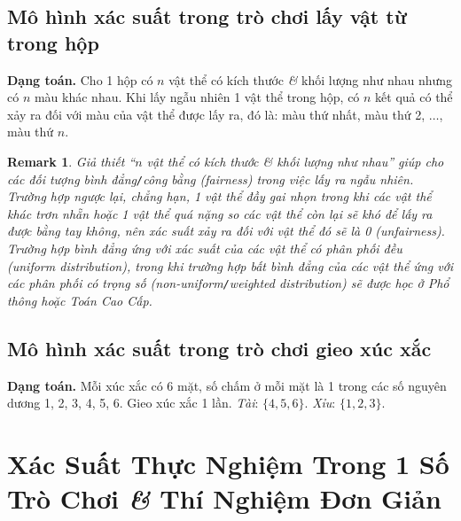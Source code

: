 \documentclass[oneside]{book}
\numberwithin{equation}{section}
\newtheorem{remark}{Remark}[section]
\begin{document}
\subsection{Mô hình xác suất trong trò chơi lấy vật từ trong hộp}
\textbf{Dạng toán.} Cho 1 hộp có $n$ vật thể có kích thước \textit{\&} khối lượng như nhau nhưng có $n$ màu khác nhau. Khi lấy ngẫu nhiên 1 vật thể trong hộp, có $n$ kết quả có thể xảy ra đối với màu của vật thể được lấy ra, đó là: màu thứ nhất, màu thứ 2, $\ldots$, màu thứ $n$.

\begin{remark}
	Giả thiết ``$n$ vật thể có kích thước \textit{\&} khối lượng như nhau'' giúp cho các đối tượng bình đẳng\emph{\texttt{/}}công bằng (fairness) trong việc lấy ra ngẫu nhiên. Trường hợp ngược lại, chẳng hạn, 1 vật thể đầy gai nhọn trong khi các vật thể khác trơn nhẵn hoặc 1 vật thể quá nặng so các vật thể còn lại sẽ khó để lấy ra được bằng tay không, nên xác suất xảy ra đối với vật thể đó sẽ là 0 (unfairness). Trường hợp bình đẳng ứng với xác suất của các vật thể có phân phối đều (uniform distribution), trong khi trường hợp bất bình đẳng của các vật thể ứng với các phân phối có trọng số (non-uniform\emph{\texttt{/}}weighted distribution) sẽ được học ở Phổ thông hoặc Toán Cao Cấp.
\end{remark}

\subsection{Mô hình xác suất trong trò chơi gieo xúc xắc}
\textbf{Dạng toán.} Mỗi xúc xắc có 6 mặt, số chấm ở mỗi mặt là 1 trong các số nguyên dương 1, 2, 3, 4, 5, 6. Gieo xúc xắc 1 lần. \textit{Tài}: $\{4,5,6\}$. \textit{Xỉu}: $\{1,2,3\}$.

\section{Xác Suất Thực Nghiệm Trong 1 Số Trò Chơi \textit{\&} Thí Nghiệm Đơn Giản}
\end{document}
